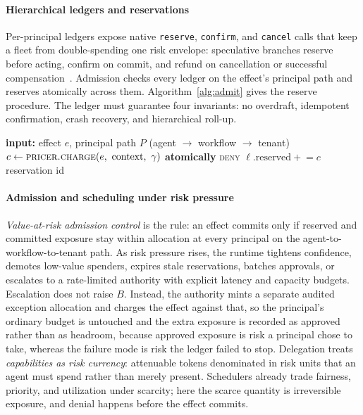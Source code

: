 \documentclass[sigconf]{acmart}
\begin{document}
\paragraph{Hierarchical ledgers and reservations} Per-principal ledgers expose native \texttt{reserve}, \texttt{confirm}, and \texttt{cancel} calls that keep a fleet from double-spending one risk envelope: speculative branches reserve before acting, confirm on commit, and refund on cancellation or successful compensation~\cite{ONeil1986Escrow,Helland2007LifeBeyond}. Admission checks every ledger on the effect's principal path and reserves atomically across them. Algorithm~\ref{alg:admit} gives the reserve procedure. The ledger must guarantee four invariants: no overdraft, idempotent confirmation, crash recovery, and hierarchical roll-up.

\begin{algorithm}[t]
\footnotesize
\caption{Value-at-risk admission (reserve).}
\label{alg:admit}
\begin{algorithmic}[1]
\State \textbf{input:} effect $e$, principal path $P$ (agent $\to$ workflow $\to$ tenant)
\State $c \gets \textsc{pricer.charge}(e,\ \text{context},\ \gamma)$ 
\State \textbf{atomically}
   \Return \textsc{deny} \EndIf
\EndFor
{} $\ell.\text{reserved} \mathrel{+}= c$ \EndFor
\State \Return reservation id 
\end{algorithmic}
\end{algorithm}

\paragraph{Admission and scheduling under risk pressure} \emph{Value-at-risk admission control} is the rule: an effect commits only if reserved and committed exposure stay within allocation at every principal on the agent-to-workflow-to-tenant path. As risk pressure rises, the runtime tightens confidence, demotes low-value spenders, expires stale reservations, batches approvals, or escalates to a rate-limited authority with explicit latency and capacity budgets. Escalation does not raise $B$. Instead, the authority mints a separate audited exception allocation and charges the effect against that, so the principal's ordinary budget is untouched and the extra exposure is recorded as approved rather than as headroom, because approved exposure is risk a principal chose to take, whereas the failure mode is risk the ledger failed to stop. Delegation treats \emph{capabilities as risk currency}: attenuable tokens denominated in risk units that an agent must spend rather than merely present. Schedulers already trade fairness, priority, and utilization under scarcity; here the scarce quantity is irreversible exposure, and denial happens before the effect commits.
\end{document}
